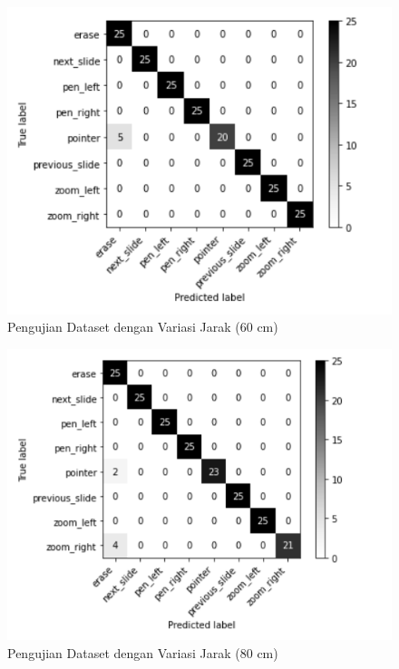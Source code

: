 \begin{figure}[!htb]
  \centering
  \includegraphics[scale=0.78]{gambar/pengujian-jarak/heterogen-dataset/60cm.png}
  \caption{Pengujian Dataset dengan Variasi Jarak (60 cm)}
  \label{fig:Pengujian Dataset dengan Variasi Jarak (60 cm)}
\end{figure}

\begin{figure}[!htb]
  \centering
  \includegraphics[scale=0.78]{gambar/pengujian-jarak/heterogen-dataset/80cm.png}
  \caption{Pengujian Dataset dengan Variasi Jarak (80 cm)}
  \label{fig:Pengujian Dataset dengan Variasi Jarak (80 cm)}
\end{figure}

